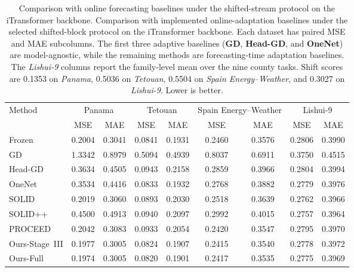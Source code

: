 ﻿\documentclass[journal]{IEEEtran}
\DeclareRobustCommand{\oldtext}[1]{{\color{revisionred}#1}}
\DeclareRobustCommand{\newtext}[1]{{\color{revisionblue}#1}}
\DeclareRobustCommand{\why}[1]{{\color{revisionblue}{\footnotesize (#1)}}}
\DeclareRobustCommand{\rw}[3]{\oldtext{#1} \newtext{#2}\why{#3}}
\begin{document}
\begin{table}[t]
\caption{\rw{Comparison with online forecasting baselines under the shifted-stream protocol on the iTransformer backbone.}{Comparison with implemented online-adaptation baselines under the selected shifted-block protocol on the iTransformer backbone.}{表注区分 proxy baseline 和 selected-block protocol。} Each dataset has paired MSE and MAE subcolumns. The first three adaptive baselines (\textbf{GD}, \textbf{Head-GD}, and \textbf{OneNet}) are model-agnostic, while the remaining methods are forecasting-time adaptation baselines. The \textit{Lishui-9} columns report the family-level mean over the nine county tasks. Shift scores are 0.1353 on \textit{Panama}, 0.5036 on \textit{Tetouan}, 0.5504 on \textit{Spain Energy--Weather}, and 0.3027 on \textit{Lishui-9}. Lower is better.}
\label{tab:shifted_online_sota}
\centering
\footnotesize
\setlength{\tabcolsep}{3.5pt}
\begin{tabular}{lcccccccc}
\toprule
Method & \multicolumn{2}{c}{Panama} & \multicolumn{2}{c}{Tetouan} & \multicolumn{2}{c}{Spain Energy--Weather} & \multicolumn{2}{c}{Lishui-9} \\
\cmidrule(lr){2-3}\cmidrule(lr){4-5}\cmidrule(lr){6-7}\cmidrule(lr){8-9}
 & MSE & MAE & MSE & MAE & MSE & MAE & MSE & MAE \\
\midrule
Frozen & 0.2004 & 0.3041 & 0.0841 & 0.1931 & 0.2460 & 0.3576 & 0.2806 & 0.3990 \\
GD & 1.3342 & 0.8979 & 0.5094 & 0.4939 & 0.8037 & 0.6911 & 0.3750 & 0.4515 \\
Head-GD & 0.3634 & 0.4505 & 0.0943 & 0.2158 & 0.2859 & 0.3966 & 0.2804 & 0.3994 \\
OneNet & 0.3534 & 0.4416 & 0.0833 & 0.1932 & 0.2768 & 0.3882 & 0.2779 & 0.3976 \\
SOLID & 0.2019 & 0.3060 & 0.0893 & 0.2030 & 0.2518 & 0.3639 & 0.2762 & 0.3966 \\
SOLID++ & 0.4500 & 0.4913 & 0.0940 & 0.2097 & 0.2992 & 0.4015 & 0.2757 & 0.3964 \\
PROCEED & 0.2042 & 0.3083 & 0.0933 & 0.2054 & 0.2420 & 0.3547 & 0.2795 & 0.3970 \\
Ours-Stage~III & 0.1977 & 0.3005 & 0.0824 & 0.1907 & 0.2415 & 0.3540 & 0.2778 & 0.3972 \\
Ours-Full & 0.1974 & 0.3005 & 0.0820 & 0.1901 & 0.2417 & 0.3535 & 0.2775 & 0.3969 \\
\bottomrule
\end{tabular}
\end{table}
\end{document}
